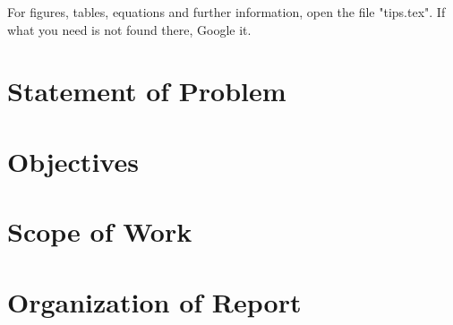 For figures, tables, equations and further information, open the file "tips.tex". If what you need is not found there, Google it.

\fi

\section{Statement of Problem}

\lipsum[2-6]

\section{Objectives}

\lipsum[2]

\section{Scope of Work}

\lipsum[2-3]

\section{Organization of Report}

\lipsum[2-4]
